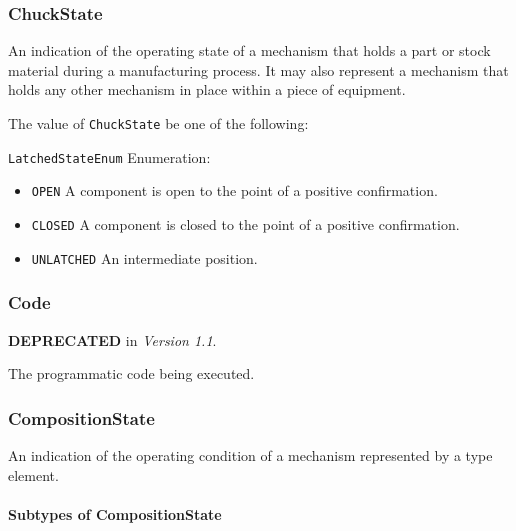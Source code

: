 \subsubsection{ChuckState}
\label{sec:ChuckState}



An indication of the operating state of a mechanism that holds a part or stock material during a manufacturing process. It may also represent a mechanism that holds any other mechanism in place within a piece of equipment.


The value of \texttt{ChuckState} \MUST be one of the following: 


\texttt{LatchedStateEnum} Enumeration:

\begin{itemize}
\item \texttt{OPEN} \newline A component is open to the point of a positive confirmation. 
\item \texttt{CLOSED} \newline A component is closed to the point of a positive confirmation. 
\item \texttt{UNLATCHED} \newline An intermediate position. 
\end{itemize}



\subsubsection{Code}
\label{sec:Code}



\textbf{DEPRECATED} in \textit{Version 1.1}.

The programmatic code being executed.



\subsubsection{CompositionState}
\label{sec:CompositionState}



An indication of the operating condition of a mechanism represented by a  type element.


\paragraph{Subtypes of CompositionState}\mbox{}
\label{sec:Subtypes of CompositionState}

